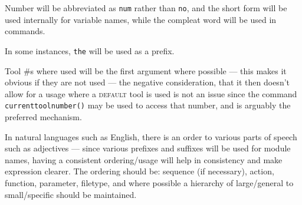 \documentclass{ltxdoc}
\begin{document}
Number will be abbreviated as \verb|num| rather than \verb|no|, and the short form will be used internally for variable names, while the compleat word will be used in commands.

In some instances, \verb|the| will be used as a prefix.

Tool \#s where used will be the first argument where possible --- this makes it obvious if they are not used --- the negative consideration, that it then doesn't allow for a usage where a \textsc{default} tool is used is not an issue since the command \verb|currenttoolnumber()| may be used to access that number, and is arguably the preferred mechanism. 

In natural languages such as English, there is an order to various parts of speech such as adjectives 
--- since various prefixes and suffixes will be used for module names, having a consistent ordering/usage will help in consistency and make expression clearer. The ordering should be: sequence (if necessary), action, function, parameter, filetype, and where possible a hierarchy of large/general to small/specific should be maintained.
\end{document}
